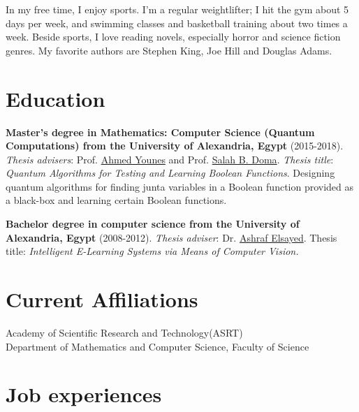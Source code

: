 \documentclass[margin,line,a4paper]{resume}
\begin{document}
\begin{resume}
        In my free time,  I enjoy sports. I'm a regular weightlifter; I hit the gym about 5 days per week, and swimming classes and basketball training about two times a week. Beside sports, I love reading novels, especially horror and science fiction genres. My favorite authors are Stephen King, Joe Hill and Douglas Adams.

    \section{\mysidestyle Education} \textbf{Master's degree in Mathematics: Computer Science (Quantum Computations) from the University of Alexandria, Egypt} (2015-2018). 
    \emph{Thesis advisers}: Prof.  \href{https://scholar.google.com.eg/citations?user=CZz2XFIAAAAJ&hl=en}{Ahmed Younes} and Prof. \href{https://scholar.google.com.eg/citations?hl=en&user=YFeMsegAAAAJ&view_op=list_works&sortby=pubdate}{Salah B. Doma}. 
     \emph{Thesis title}: \textit{Quantum Algorithms for Testing and Learning Boolean Functions}. Designing quantum algorithms for finding junta variables in a Boolean function provided as a black-box and learning certain Boolean functions.

    \textbf{Bachelor degree in computer science from the University of Alexandria, Egypt}
    (2008-2012).  \emph{Thesis adviser}: Dr. \href{https://scholar.google.com.eg/citations?hl=en&user=G9tQkdIAAAAJ&view_op=list_works&sortby=pubdate}{Ashraf Elsayed}.
    Thesis title: \textit{Intelligent E-Learning Systems via Means of Computer Vision.}

%    

\section{\mysidestyle Current Affiliations}\vspace{1mm}
\begin{description}
    \item[Academy of Scientific Research and Technology(ASRT)]
    \item[Department of Mathematics and Computer Science, Faculty of Science] 
\end{description}


\section{\mysidestyle Job experiences}\vspace{1mm}
\begin{description}
    


\end{description}
\end{resume}
\end{document}
